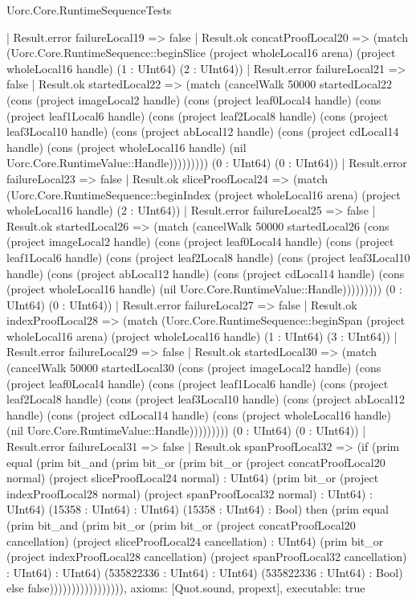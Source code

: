 \begin{lexlean}{Uorc.Core.RuntimeSequenceTests}
\begin{semanticmodule}
{                      | Result.error failureLocal19 => false
                      | Result.ok concatProofLocal20 => (match (Uorc.Core.RuntimeSequence::beginSlice (project wholeLocal16 arena) (project wholeLocal16 handle) (1 : UInt64) (2 : UInt64))
                        | Result.error failureLocal21 => false
                        | Result.ok startedLocal22 => (match (cancelWalk 50000 startedLocal22 (cons (project imageLocal2 handle) (cons (project leaf0Local4 handle) (cons (project leaf1Local6 handle) (cons (project leaf2Local8 handle) (cons (project leaf3Local10 handle) (cons (project abLocal12 handle) (cons (project cdLocal14 handle) (cons (project wholeLocal16 handle) (nil Uorc.Core.RuntimeValue::Handle))))))))) (0 : UInt64) (0 : UInt64))
                          | Result.error failureLocal23 => false
                          | Result.ok sliceProofLocal24 => (match (Uorc.Core.RuntimeSequence::beginIndex (project wholeLocal16 arena) (project wholeLocal16 handle) (2 : UInt64))
                            | Result.error failureLocal25 => false
                            | Result.ok startedLocal26 => (match (cancelWalk 50000 startedLocal26 (cons (project imageLocal2 handle) (cons (project leaf0Local4 handle) (cons (project leaf1Local6 handle) (cons (project leaf2Local8 handle) (cons (project leaf3Local10 handle) (cons (project abLocal12 handle) (cons (project cdLocal14 handle) (cons (project wholeLocal16 handle) (nil Uorc.Core.RuntimeValue::Handle))))))))) (0 : UInt64) (0 : UInt64))
                              | Result.error failureLocal27 => false
                              | Result.ok indexProofLocal28 => (match (Uorc.Core.RuntimeSequence::beginSpan (project wholeLocal16 arena) (project wholeLocal16 handle) (1 : UInt64) (3 : UInt64))
                                | Result.error failureLocal29 => false
                                | Result.ok startedLocal30 => (match (cancelWalk 50000 startedLocal30 (cons (project imageLocal2 handle) (cons (project leaf0Local4 handle) (cons (project leaf1Local6 handle) (cons (project leaf2Local8 handle) (cons (project leaf3Local10 handle) (cons (project abLocal12 handle) (cons (project cdLocal14 handle) (cons (project wholeLocal16 handle) (nil Uorc.Core.RuntimeValue::Handle))))))))) (0 : UInt64) (0 : UInt64))
                                  | Result.error failureLocal31 => false
                                  | Result.ok spanProofLocal32 => (if (prim equal (prim bit_and (prim bit_or (prim bit_or (project concatProofLocal20 normal) (project sliceProofLocal24 normal) : UInt64) (prim bit_or (project indexProofLocal28 normal) (project spanProofLocal32 normal) : UInt64) : UInt64) (15358 : UInt64) : UInt64) (15358 : UInt64) : Bool) then (prim equal (prim bit_and (prim bit_or (prim bit_or (project concatProofLocal20 cancellation) (project sliceProofLocal24 cancellation) : UInt64) (prim bit_or (project indexProofLocal28 cancellation) (project spanProofLocal32 cancellation) : UInt64) : UInt64) (535822336 : UInt64) : UInt64) (535822336 : UInt64) : Bool) else false))))))))))))))))),
  axioms: [Quot.sound, propext],
  executable: true
}


\end{semanticmodule}
\end{lexlean}
